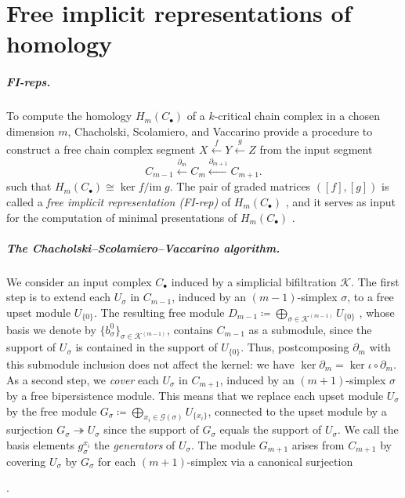 \documentclass[11pt]{article}
\newcommand{\define}[1]{\emph{#1}} %
\newcommand{\im}{\mathrm{im}\;}
\begin{document}
\section{Free implicit representations of homology}
\label{sec:FI-reps}
%
\subparagraph{FI-reps.} To compute the homology $H_m(C_\bullet)$ of a $k$-critical chain complex in a chosen dimension $m$, Chacholski, Scolamiero, and Vaccarino \cite{swedish} provide a procedure
to construct a free chain complex segment $X \xleftarrow{f} Y \xleftarrow{g} Z $ from the input segment
\begin{equation}
\label{diag:chain_complex_segment}
C_{m-1}\xleftarrow{\partial_m} C_m \xleftarrow{\partial_{m+1}}C_{m+1}.
\end{equation}
such that $H_m(C_\bullet)\cong \ker f / \im g$. The pair of graded matrices $([f],[g])$ is called a \define{free implicit representation (FI-rep)} of $H_m(C_\bullet)$ \cite{lw-computing}, and it serves as input for the computation of minimal presentations of $H_m(C_\bullet)$ \cite{lw-computing,kr-fast}. 
%
%
%
%
\subparagraph{The Chacholski--Scolamiero--Vaccarino algorithm.} We consider an input complex $C_\bullet$ induced by a simplicial bifiltration $\mathcal{K}$.
The first step is to extend each $U_\sigma$ in $C_{m-1}$, induced by an $(m-1)$-simplex $\sigma$, to a free upset module $U_{\{0\}}$.
The resulting free module $D_{m-1}\coloneqq 
\bigoplus_{\sigma\in \mathcal{K}^{(m-1)}} U_{\{0\}}$ , whose basis we denote by $\{b_\sigma^0\}_{\sigma\in \mathcal{K}^{(m-1)}}$, contains $C_{m-1}$ as a submodule, since the support of $U_\sigma$ is contained in the support of $U_{\{0\}}$.
Thus, postcomposing $\partial_m$ with this submodule inclusion does not affect the kernel: we have $\ker\partial_{m} = \ker\iota\circ\partial_{m}$.
%
As a second step, we \define{cover} each $U_\sigma$ in $C_{m+1}$, induced by an $(m+1)$-simplex $\sigma$ by a free bipersistence module.
This means that we replace each upset module $U_\sigma$ by the free module 
$
G_\sigma\coloneqq 
\bigoplus_{x_i \in \mathcal{G}(\sigma)} U_{\{x_i\}}
$,
connected to the upset module by a surjection $G_\sigma \twoheadrightarrow U_\sigma$ since the support of $G_\sigma$ equals the support of $U_\sigma$.
We call the basis elements $g^{x_i}_\sigma$ the \define{generators} of $
U_\sigma$.
The module $G_{m+1}$ arises from $C_{m+1}$ by covering $U_\sigma$ by $G_\sigma$ for each $(m+1)$-simplex via a canonical surjection .
\end{document}
